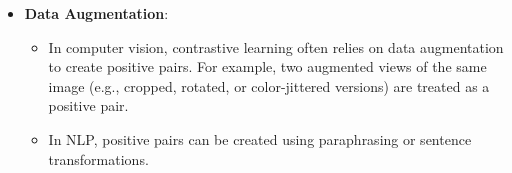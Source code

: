\begin{notechapter}
\begin{itemize}
\begin{itemize}
\begin{itemize}
                              pairs.
                        \item \(\text{sim}(\cdot)\) is a similarity 
                              function (e.g., cosine similarity).
                        \item \(\tau\) is a temperature parameter that 
                              controls the sharpness of the 
                              distribution.
                    \end{itemize}
          \end{itemize}
    \item \textbf{Data Augmentation}:
          \begin{itemize}
              \item In computer vision, contrastive learning often 
                    relies on data augmentation to create positive 
                    pairs. For example, two augmented views of the same 
                    image (e.g., cropped, rotated, or color-jittered 
                    versions) are treated as a positive pair.
              \item In NLP, positive pairs can be created using 
                    paraphrasing or sentence transformations.
          \end{itemize}
\end{itemize}


\end{notechapter}
